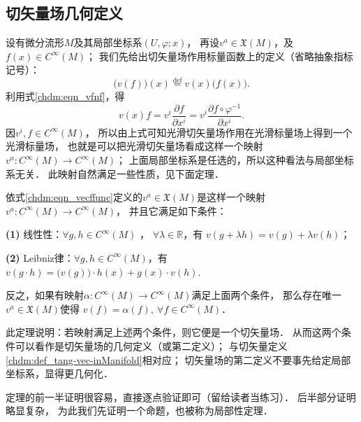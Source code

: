 \subsection{切矢量场几何定义}\label{chdm:sec_vdef2}
设有微分流形$M$及其局部坐标系$(U,\varphi;x)$，
再设$v^a\in \mathfrak{X}(M)$，及$f(x) \in C^\infty(M)$；
我们先给出切矢量场作用标量函数上的定义（省略抽象指标记号）：
\begin{equation}\label{chdm:eqn_vecffunc}
    \bigl(v(f)\bigr) (x)  \overset{\mathrm {def}}{=}  v(x) \bigl( f(x)\bigr) .
\end{equation}
利用式\eqref{chdm:eqn_vfnf}，得
\begin{equation}
    v(x) f = v^i \frac{\partial f }{\partial x^i} = 
    v^i \frac{\partial f\circ \varphi^{-1} }{\partial x^i}.
\end{equation}
因$v^i, f \in C^\infty(M)$，
所以由上式可知光滑切矢量场作用在光滑标量场上得到一个光滑标量场，
也就是可以把光滑切矢量场看成这样一个映射$v^a:C^\infty(M)\to C^\infty(M)$；
上面局部坐标系是任选的，所以这种看法与局部坐标系无关．
此映射自然满足一些性质，见下面定理．



\begin{theorem}\label{chdm:thm_vf-def2}
    依式\eqref{chdm:eqn_vecffunc}定义的$v^a\in \mathfrak{X}(M)$是这样一个映射$v^a:C^\infty(M)\to C^\infty(M)$，
    并且它满足如下条件：

    {\bfseries (1)} 线性性：$\forall g,h \in C^\infty(M) $ ， $\forall \lambda \in \mathbb{R}$，有
    $v (g+\lambda h) = v (g)+ \lambda v (h) $；

    {\bfseries (2)} Leibniz律：$\forall g,h \in C^\infty(M) $，有
    $v(g\cdot h)= \bigl(v(g)\bigr)\cdot h(x)+ g(x)\cdot v (h) .$ 
    
    反之，如果有映射$\alpha:C^\infty(M)\to C^\infty(M) $满足上面两个条件，
    那么存在唯一$v^a\in \mathfrak{X}(M)$使得
    $v(f)=\alpha(f),\ \forall f\in C^\infty(M)$．
\end{theorem}

此定理说明：若映射满足上述两个条件，则它便是一个切矢量场．
从而这两个条件可以看作是切矢量场的几何定义（或第二定义）；
与切矢量定义\ref{chdm:def_tang-vec-inManifold}相对应；
切矢量场的第二定义不要事先给定局部坐标系，显得更几何化．

定理的前一半证明很容易，直接逐点验证即可（留给读者当练习）．
后半部分证明略显复杂，
为此我们先证明一个命题，也被称为{\heiti 局部性定理}．


